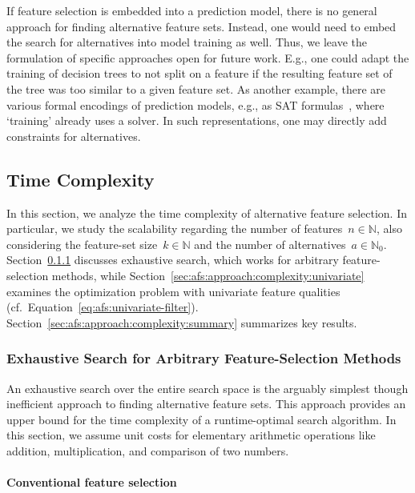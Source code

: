 \documentclass{article}
\theoremstyle{definition}
\begin{document}
If feature selection is embedded into a prediction model, there is no general approach for finding alternative feature sets.
Instead, one would need to embed the search for alternatives into model training as well.
Thus, we leave the formulation of specific approaches open for future work.
E.g., one could adapt the training of decision trees to not split on a feature if the resulting feature set of the tree was too similar to a given feature set.
As another example, there are various formal encodings of prediction models, e.g., as \textsc{SAT} formulas~\cite{narodytska2018learning, schidler2021sat, yu2021learning}, where `training' already uses a solver.
In such representations, one may directly add constraints for alternatives.

\subsection{Time Complexity}
\label{sec:afs:approach:complexity}

In this section, we analyze the time complexity of alternative feature selection.
In particular, we study the scalability regarding the number of features~$n \in \mathbb{N}$, also considering the feature-set size~$k \in \mathbb{N}$ and the number of alternatives~$a \in \mathbb{N}_0$.
Section~\ref{sec:afs:approach:complexity:exhaustive} discusses exhaustive search, which works for arbitrary feature-selection methods, while Section~\ref{sec:afs:approach:complexity:univariate} examines the optimization problem with univariate feature qualities (cf.~Equation~\ref{eq:afs:univariate-filter}).
Section~\ref{sec:afs:approach:complexity:summary} summarizes key results.

\subsubsection{Exhaustive Search for Arbitrary Feature-Selection Methods}
\label{sec:afs:approach:complexity:exhaustive}

An exhaustive search over the entire search space is the arguably simplest though inefficient approach to finding alternative feature sets.
This approach provides an upper bound for the time complexity of a runtime-optimal search algorithm.
In this section, we assume unit costs for elementary arithmetic operations like addition, multiplication, and comparison of two numbers.

\paragraph{Conventional feature selection}
\end{document}
